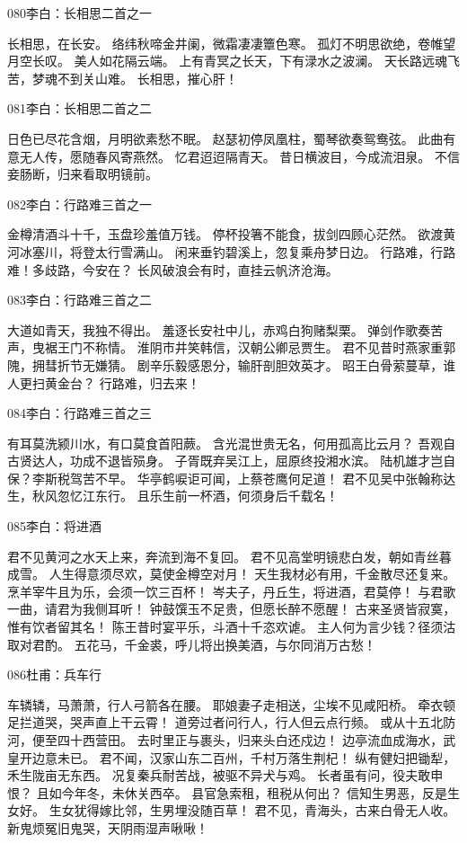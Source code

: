080李白：长相思二首之一

长相思，在长安。
络纬秋啼金井阑，微霜凄凄簟色寒。
孤灯不明思欲绝，卷帷望月空长叹。
美人如花隔云端。
上有青冥之长天，下有渌水之波澜。
天长路远魂飞苦，梦魂不到关山难。
长相思，摧心肝！

081李白：长相思二首之二

日色已尽花含烟，月明欲素愁不眠。
赵瑟初停凤凰柱，蜀琴欲奏鸳鸯弦。
此曲有意无人传，愿随春风寄燕然。
忆君迢迢隔青天。
昔日横波目，今成流泪泉。
不信妾肠断，归来看取明镜前。

082李白：行路难三首之一

金樽清酒斗十千，玉盘珍羞值万钱。
停杯投箸不能食，拔剑四顾心茫然。
欲渡黄河冰塞川，将登太行雪满山。
闲来垂钓碧溪上，忽复乘舟梦日边。
行路难，行路难！多歧路，今安在？
长风破浪会有时，直挂云帆济沧海。

083李白：行路难三首之二

大道如青天，我独不得出。
羞逐长安社中儿，赤鸡白狗赌梨栗。
弹剑作歌奏苦声，曳裾王门不称情。
淮阴市井笑韩信，汉朝公卿忌贾生。
君不见昔时燕家重郭隗，拥彗折节无嫌猜。
剧辛乐毅感恩分，输肝剖胆效英才。
昭王白骨萦蔓草，谁人更扫黄金台？
行路难，归去来！

084李白：行路难三首之三

有耳莫洗颍川水，有口莫食首阳蕨。
含光混世贵无名，何用孤高比云月？
吾观自古贤达人，功成不退皆殒身。
子胥既弃吴江上，屈原终投湘水滨。
陆机雄才岂自保？李斯税驾苦不早。
华亭鹤唳讵可闻，上蔡苍鹰何足道！
君不见吴中张翰称达生，秋风忽忆江东行。
且乐生前一杯酒，何须身后千载名！

085李白：将进酒

君不见黄河之水天上来，奔流到海不复回。
君不见高堂明镜悲白发，朝如青丝暮成雪。
人生得意须尽欢，莫使金樽空对月！
天生我材必有用，千金散尽还复来。
烹羊宰牛且为乐，会须一饮三百杯！
岑夫子，丹丘生，将进酒，君莫停！
与君歌一曲，请君为我侧耳听！
钟鼓馔玉不足贵，但愿长醉不愿醒！
古来圣贤皆寂寞，惟有饮者留其名！
陈王昔时宴平乐，斗酒十千恣欢谑。
主人何为言少钱？径须沽取对君酌。
五花马，千金裘，呼儿将出换美酒，与尔同消万古愁！

086杜甫：兵车行

车辚辚，马萧萧，行人弓箭各在腰。
耶娘妻子走相送，尘埃不见咸阳桥。
牵衣顿足拦道哭，哭声直上干云霄！
道旁过者问行人，行人但云点行频。
或从十五北防河，便至四十西营田。
去时里正与裹头，归来头白还戍边！
边亭流血成海水，武皇开边意未已。
君不闻，汉家山东二百州，千村万落生荆杞！
纵有健妇把锄犁，禾生陇亩无东西。
况复秦兵耐苦战，被驱不异犬与鸡。
长者虽有问，役夫敢申恨？
且如今年冬，未休关西卒。
县官急索租，租税从何出？
信知生男恶，反是生女好。
生女犹得嫁比邻，生男埋没随百草！
君不见，青海头，古来白骨无人收。
新鬼烦冤旧鬼哭，天阴雨湿声啾啾！

